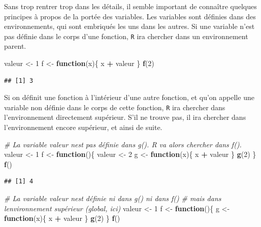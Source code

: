 \documentclass[
  11pt,
]{book}
\newenvironment{Shaded}{\begin{snugshade}}{\end{snugshade}}
\newcommand{\CommentTok}[1]{\textcolor[rgb]{0.56,0.35,0.01}{\textit{#1}}}
\newcommand{\ControlFlowTok}[1]{\textcolor[rgb]{0.13,0.29,0.53}{\textbf{#1}}}
\newcommand{\DecValTok}[1]{\textcolor[rgb]{0.00,0.00,0.81}{#1}}
\newcommand{\KeywordTok}[1]{\textcolor[rgb]{0.13,0.29,0.53}{\textbf{#1}}}
\newcommand{\NormalTok}[1]{#1}
\newcommand{\OperatorTok}[1]{\textcolor[rgb]{0.81,0.36,0.00}{\textbf{#1}}}
\newcommand{\StringTok}[1]{\textcolor[rgb]{0.31,0.60,0.02}{#1}}
\numberwithin{equation}{section}
\numberwithin{countremarque}{section}
\begin{document}
Sans trop rentrer trop dans les détails, il semble important de connaître quelques principes à propos de la portée des variables. Les variables sont définies dans des environnements, qui sont embriqués les uns dans les autres. Si une variable n'est pas définie dans le corps d'une fonction, \texttt{R} ira chercher dans un environnement parent.

\begin{Shaded}
\begin{Highlighting}[]
\NormalTok{valeur \textless{}{-}}\StringTok{ }\DecValTok{1}
\NormalTok{f \textless{}{-}}\StringTok{ }\ControlFlowTok{function}\NormalTok{(x)\{}
\NormalTok{  x }\OperatorTok{+}\StringTok{ }\NormalTok{valeur}
\NormalTok{\}}
\KeywordTok{f}\NormalTok{(}\DecValTok{2}\NormalTok{)}
\end{Highlighting}
\end{Shaded}

\begin{lstlisting}
## [1] 3
\end{lstlisting}

Si on définit une fonction à l'intérieur d'une autre fonction, et qu'on appelle une variable non définie dans le corps de cette fonction, \texttt{R} ira chercher dans l'environnement directement supérieur. S'il ne trouve pas, il ira chercher dans l'environnement encore supérieur, et ainsi de suite.

\begin{Shaded}
\begin{Highlighting}[]
\CommentTok{\# La variable valeur n\textquotesingle{}est pas définie dans g(). R va alors chercher dans f().}
\NormalTok{valeur \textless{}{-}}\StringTok{ }\DecValTok{1}
\NormalTok{f \textless{}{-}}\StringTok{ }\ControlFlowTok{function}\NormalTok{()\{}
\NormalTok{  valeur \textless{}{-}}\StringTok{ }\DecValTok{2}
\NormalTok{  g \textless{}{-}}\StringTok{ }\ControlFlowTok{function}\NormalTok{(x)\{}
\NormalTok{    x }\OperatorTok{+}\StringTok{ }\NormalTok{valeur}
\NormalTok{  \}}
  \KeywordTok{g}\NormalTok{(}\DecValTok{2}\NormalTok{)}
\NormalTok{\}}
\KeywordTok{f}\NormalTok{()}
\end{Highlighting}
\end{Shaded}

\begin{lstlisting}
## [1] 4
\end{lstlisting}

\begin{Shaded}
\begin{Highlighting}[]
\CommentTok{\# La variable valeur n\textquotesingle{}est définie ni dans g() ni dans f()}
\CommentTok{\# mais dans l\textquotesingle{}environnement supérieur (global, ici)}
\NormalTok{valeur \textless{}{-}}\StringTok{ }\DecValTok{1}
\NormalTok{f \textless{}{-}}\StringTok{ }\ControlFlowTok{function}\NormalTok{()\{}
\NormalTok{  g \textless{}{-}}\StringTok{ }\ControlFlowTok{function}\NormalTok{(x)\{}
\NormalTok{    x }\OperatorTok{+}\StringTok{ }\NormalTok{valeur}
\NormalTok{  \}}
  \KeywordTok{g}\NormalTok{(}\DecValTok{2}\NormalTok{)}
\NormalTok{\}}
\KeywordTok{f}\NormalTok{()}
\end{Highlighting}
\end{Shaded}
\end{document}
